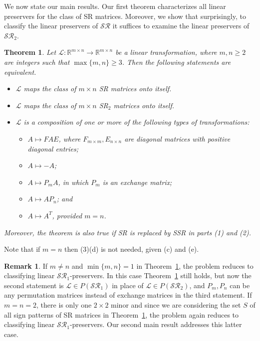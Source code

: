 \documentclass[11pt,reqno]{amsart}
\theoremstyle{plain}
\newtheorem{utheorem}{\textrm{\textbf{Theorem}}}
\theoremstyle{definition}
\newtheorem{rem}[theorem]{Remark}
\numberwithin{equation}{section}
\begin{document}
We now state our main results. Our first theorem characterizes all linear preservers for the class of SR matrices. Moreover, we show that surprisingly, to classify the linear preservers of $\mathcal{SR}$ it suffices to examine the linear preservers of $\mathcal{SR}_2$.  

\begin{utheorem} \label{D}
	Let $\mathcal{L}:\mathbb{R}^{m\times n}\to\mathbb{R}^{m\times n}$  be a linear transformation, where $m,n \geq 2$ are integers such that $\max\{m,n\}\geq3$. Then the following statements are equivalent.
	\begin{itemize}
		\item[(1)] $\mathcal{L}$ maps the class of $m\times n$ SR matrices onto itself.
		\item[(2)] $\mathcal{L}$ maps the class of $m\times n$ SR$_2$ matrices onto itself.
		\item[(3)] $\mathcal{L}$ is a composition of one or more of the following types of transformations:
		\begin{itemize}
			\item[(a)] $A\mapsto FAE$, where $F_{m\times m}, E_{n\times n}$ are diagonal matrices with positive diagonal entries;
			\item[(b)] $A\mapsto -A$;
			\item[(c)] $A\mapsto P_mA$, in which $P_m$ is an exchange matrix;
			\item[(d)] $A\mapsto AP_n$;  and
			\item[(e)] $A\mapsto A^T$, provided $m=n$.
		\end{itemize}
	\end{itemize}
	Moreover, the theorem is also true if SR is replaced by SSR in parts (1) and (2).
\end{utheorem}

Note that if $m=n$ then (3)(d) is not needed, given (c) and (e).

\begin{rem}
	If $m \neq n$ and $\min\{m,n\}=1$ in Theorem~\ref{D}, the problem reduces to classifying linear $\mathcal{SR}_1$-preservers. In this case Theorem~\ref{D} still holds, but now the second statement is $\mathcal{L} \in P (\mathcal{SR}_1)$ in place of  $\mathcal{L} \in P(\mathcal{SR}_2)$, and $P_m, P_n$ can be any permutation matrices instead of exchange matrices in the third statement. If $m=n=2$, there is only one $2\times 2$ minor and since we are considering  the set $S$ of all sign patterns of SR matrices in Theorem~\ref{D}, the problem again reduces to classifying linear $\mathcal{SR}_1$-preservers. Our second main result addresses this latter case.
\end{rem}
\end{document}
